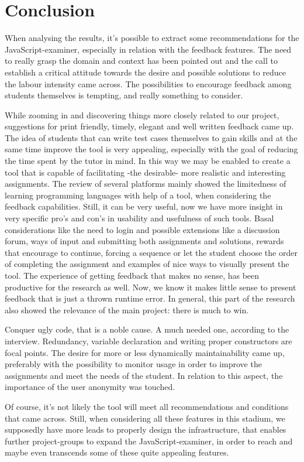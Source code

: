 \documentclass{article}
\begin{document}
\section{Conclusion} 
When analysing the results, it's possible to extract some recommendations for 
the JavaScript-examiner, especially in relation with the feedback features. The
need to really grasp the domain and context has been pointed out and the call to
establish a critical attitude towards the desire and possible solutions
to reduce the labour intensity came across. The possibilities to encourage 
feedback among students themselves is tempting, and really something to consider.


While zooming in and discovering things more closely related to our 
project, suggestions for print friendly, timely, elegant and well written 
feedback came up. The idea of students that can write test cases themselves to 
gain skills and at the same time improve the tool is very appealing, especially 
with the goal of reducing the time spent by the tutor in mind. In this way we 
may be enabled to create 
a tool that is capable of facilitating -the desirable- more realistic and 
interesting assignments. The review of several platforms mainly showed the 
limitedness of learning programming languages with help of a tool, when 
considering the feedback capabilities. Still, it can be very useful, now we have 
more insight in very specific pro's and con's in usability and usefulness of such 
tools. Basal considerations like the need to login and possible extensions like a 
discussion forum, ways of input and submitting both assignments and solutions, 
rewards that encourage to continue, forcing a sequence or let the student choose 
the order of completing the assignment and examples of nice ways to visually 
present the tool. 
The experience of getting feedback that makes no sense, has been productive for the 
research as well. Now, we know it makes little sense to present feedback that 
is just a thrown runtime error. In general, this part of the research also showed the 
relevance of the main project: there is much to win.


Conquer ugly code, that is a noble cause. A much needed one, according to the
interview. Redundancy, variable declaration and writing proper constructors are
focal points. The desire for more or less dynamically maintainability came
up, preferably with the possibility to monitor usage in order to improve the 
assignments and meet the needs of the student. In relation to this aspect, the 
importance of the user anonymity was touched.


Of course, it's not likely the tool will meet all recommendations and 
conditions that came across.
Still, when considering all these features in this stadium, we supposedly have 
more leads to properly design the infrastructure, that enables further 
project-groups to expand the JavaScript-examiner, in order to reach and maybe
even transcends some of these quite appealing features. 



\end{document}
